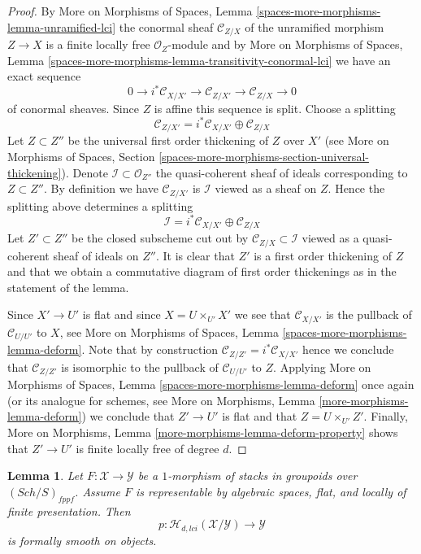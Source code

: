 \documentclass{stacks-project}
\theoremstyle{plain}
\newtheorem{lemma}[subsection]{Lemma}
\theoremstyle{definition}
\theoremstyle{remark}
\numberwithin{equation}{subsection}
\def\Sch{\mathit{Sch}}
\begin{document}
\begin{proof}
By
More on Morphisms of Spaces,
Lemma \ref{spaces-more-morphisms-lemma-unramified-lci}
the conormal sheaf $\mathcal{C}_{Z/X}$ of the unramified morphism $Z \to X$
is a finite locally free $\mathcal{O}_Z$-module and by
More on Morphisms of Spaces,
Lemma \ref{spaces-more-morphisms-lemma-transitivity-conormal-lci}
we have an exact sequence
$$
0 \to i^*\mathcal{C}_{X/X'} \to
\mathcal{C}_{Z/X'} \to
\mathcal{C}_{Z/X} \to 0
$$
of conormal sheaves. Since $Z$ is affine this sequence is split. Choose
a splitting
$$
\mathcal{C}_{Z/X'} = i^*\mathcal{C}_{X/X'} \oplus \mathcal{C}_{Z/X}
$$
Let $Z \subset Z''$ be the universal first order thickening of $Z$
over $X'$ (see
More on Morphisms of Spaces,
Section \ref{spaces-more-morphisms-section-universal-thickening}).
Denote $\mathcal{I} \subset \mathcal{O}_{Z''}$ the quasi-coherent sheaf
of ideals corresponding to $Z \subset Z''$. By definition we have
$\mathcal{C}_{Z/X'}$ is $\mathcal{I}$ viewed as a sheaf on $Z$.
Hence the splitting above determines a splitting
$$
\mathcal{I} = i^*\mathcal{C}_{X/X'} \oplus \mathcal{C}_{Z/X}
$$
Let $Z' \subset Z''$ be the closed subscheme cut out by
$\mathcal{C}_{Z/X} \subset \mathcal{I}$ viewed as a quasi-coherent sheaf
of ideals on $Z''$. It is clear that $Z'$ is a first order thickening
of $Z$ and that we obtain a commutative diagram of first order thickenings
as in the statement of the lemma.

\medskip\noindent
Since $X' \to U'$ is flat and since $X = U \times_{U'} X'$ we see that
$\mathcal{C}_{X/X'}$ is the pullback of $\mathcal{C}_{U/U'}$ to $X$, see
More on Morphisms of Spaces, Lemma \ref{spaces-more-morphisms-lemma-deform}.
Note that by construction $\mathcal{C}_{Z/Z'} = i^*\mathcal{C}_{X/X'}$
hence we conclude that $\mathcal{C}_{Z/Z'}$ is isomorphic to the pullback
of $\mathcal{C}_{U/U'}$ to $Z$. Applying
More on Morphisms of Spaces, Lemma \ref{spaces-more-morphisms-lemma-deform}
once again (or its analogue for schemes, see
More on Morphisms, Lemma \ref{more-morphisms-lemma-deform})
we conclude that $Z' \to U'$ is flat and that $Z = U \times_{U'} Z'$.
Finally,
More on Morphisms, Lemma \ref{more-morphisms-lemma-deform-property}
shows that $Z' \to U'$ is finite locally free of degree $d$.
\end{proof}

\begin{lemma}
\label{lemma-lci-formally-smooth}
Let $F : \mathcal{X} \to \mathcal{Y}$ be a $1$-morphism of stacks in groupoids
over $(\Sch/S)_{fppf}$. Assume $F$ is representable by algebraic
spaces, flat, and locally of finite presentation. Then
$$
p : \mathcal{H}_{d, lci}(\mathcal{X}/\mathcal{Y}) \to \mathcal{Y}
$$
is formally smooth on objects.
\end{lemma}
\end{document}

